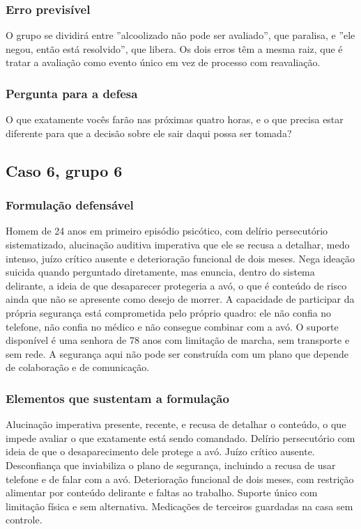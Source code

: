 \subsubsection*{Erro previsível}

O grupo se dividirá entre ''alcoolizado não pode ser avaliado'', que paralisa, e ''ele negou, então está resolvido'', que libera. Os dois erros têm a mesma raiz, que é tratar a avaliação como evento único em vez de processo com reavaliação.

\subsubsection*{Pergunta para a defesa}

O que exatamente vocês farão nas próximas quatro horas, e o que precisa estar diferente para que a decisão sobre ele sair daqui possa ser tomada?

\filete

\subsection*{Caso 6, grupo 6}

\subsubsection*{Formulação defensável}

Homem de 24 anos em primeiro episódio psicótico, com delírio persecutório sistematizado, alucinação auditiva imperativa que ele se recusa a detalhar, medo intenso, juízo crítico ausente e deterioração funcional de dois meses. Nega ideação suicida quando perguntado diretamente, mas enuncia, dentro do sistema delirante, a ideia de que desaparecer protegeria a avó, o que é conteúdo de risco ainda que não se apresente como desejo de morrer. A capacidade de participar da própria segurança está comprometida pelo próprio quadro: ele não confia no telefone, não confia no médico e não consegue combinar com a avó. O suporte disponível é uma senhora de 78 anos com limitação de marcha, sem transporte e sem rede. A segurança aqui não pode ser construída com um plano que depende de colaboração e de comunicação.

\subsubsection*{Elementos que sustentam a formulação}

Alucinação imperativa presente, recente, e recusa de detalhar o conteúdo, o que impede avaliar o que exatamente está sendo comandado. Delírio persecutório com ideia de que o desaparecimento dele protege a avó. Juízo crítico ausente. Desconfiança que inviabiliza o plano de segurança, incluindo a recusa de usar telefone e de falar com a avó. Deterioração funcional de dois meses, com restrição alimentar por conteúdo delirante e faltas ao trabalho. Suporte único com limitação física e sem alternativa. Medicações de terceiros guardadas na casa sem controle.

